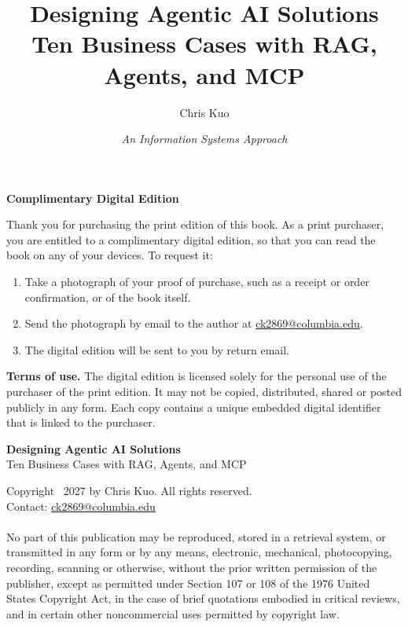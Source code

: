 \documentclass[11pt,openany]{book}
\title{Designing Agentic AI Solutions\\[6pt]
  \large Ten Business Cases with RAG, Agents, and MCP}
\author{Chris Kuo}
\date{\textit{An Information Systems Approach}}
\begin{document}




\frontmatter

\clearpage
\begingroup
\footnotesize
\setlength{\parindent}{0pt}
\setlength{\parskip}{0.6\baselineskip}

\begin{tcolorbox}[colback=white, colframe=black!40, boxrule=0.4pt, arc=1pt,
                  left=8pt, right=8pt, top=6pt, bottom=6pt]
\setlength{\parskip}{0.5\baselineskip}
\textbf{Complimentary Digital Edition}

Thank you for purchasing the print edition of this book. As a print purchaser, you are entitled to a complimentary digital edition, so that you can read the book on any of your devices. To request it:
\begin{enumerate}[itemsep=0pt, topsep=2pt, leftmargin=1.5em]
  \item Take a photograph of your proof of purchase, such as a receipt or order confirmation, or of the book itself.
  \item Send the photograph by email to the author at \href{mailto:ck2869@columbia.edu}{ck2869@columbia.edu}.
  \item The digital edition will be sent to you by return email.
\end{enumerate}
\textbf{Terms of use.} The digital edition is licensed solely for the personal use of the purchaser of the print edition. It may not be copied, distributed, shared or posted publicly in any form. Each copy contains a unique embedded digital identifier that is linked to the purchaser.
\end{tcolorbox}

\vspace*{3cm}

\textbf{Designing Agentic AI Solutions}\\
Ten Business Cases with RAG, Agents, and MCP

Copyright \textcopyright\ 2027 by Chris Kuo. All rights reserved. \\
Contact: \href{mailto:ck2869@columbia.edu}{ck2869@columbia.edu} \\
\\
No part of this publication may be reproduced, stored in a retrieval system, or transmitted in any form or by any means, electronic, mechanical, photocopying, recording, scanning or otherwise, without the prior written permission of the publisher, except as permitted under Section 107 or 108 of the 1976 United States Copyright Act, in the case of brief quotations embodied in critical reviews, and in certain other noncommercial uses permitted by copyright law.
\end{document}

